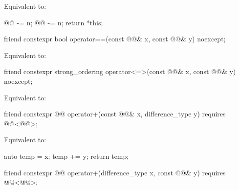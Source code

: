 \begin{itemdescr}
\pnum
\effects
Equivalent to:
\begin{codeblock}
@@ -= n;
@@ -= n;
return *this;
\end{codeblock}
\end{itemdescr}

%
\begin{itemdecl}
friend constexpr bool operator==(const @@& x, const @@& y) noexcept;
\end{itemdecl}

\begin{itemdescr}
\pnum
\effects
Equivalent to: 
\end{itemdescr}

%
\begin{itemdecl}
friend constexpr strong_ordering operator<=>(const @@& x, const @@& y) noexcept;
\end{itemdecl}

\begin{itemdescr}
\pnum
\effects
Equivalent to: 
\end{itemdescr}

%
\begin{itemdecl}
friend constexpr @@ operator+(const @@& x, difference_type y)
  requires @@<@@>;
\end{itemdecl}

\begin{itemdescr}
\pnum
\effects
Equivalent to:
\begin{codeblock}
auto temp = x;
temp += y;
return temp;
\end{codeblock}
\end{itemdescr}

%
\begin{itemdecl}
friend constexpr @@ operator+(difference_type x, const @@& y)
  requires @@<@@>;
\end{itemdecl}

